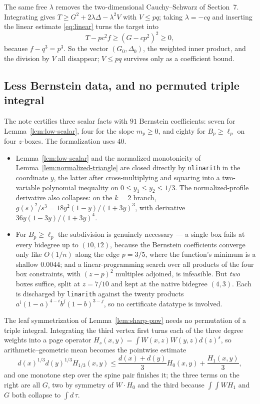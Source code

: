 \documentclass[11pt]{article}
\begin{document}
The same free $\lambda$ removes the two-dimensional Cauchy--Schwarz of
Section~7.  Integrating gives $T\geq G^2+2\lambda\Delta-\lambda^2V$ with
$V\leq pq$; taking $\lambda=-cq$ and inserting the linear estimate
\eqref{eq:linear} turns the target into
\[
 T-pc^2f\geq(G-cp^2)^2\geq0,
\]
because $f-q^3=p^3$.  So the vector $(G_0,\Delta_0)$, the weighted inner
product, and the division by $V$ all disappear; $V\leq pq$ survives only as a
coefficient bound.

\subsection{Less Bernstein data, and no permuted triple integral}
\label{sec:app148-bernstein}

The note certifies three scalar facts with $91$ Bernstein coefficients: seven
for Lemma~\ref{lem:low-scalar}, four for the slope $m_p\geq0$, and eighty for
$B_p\geq\ell_p$ on four $z$-boxes.  The formalization uses $40$.

\begin{itemize}
 \item Lemma~\ref{lem:low-scalar} and the normalized monotonicity of
 Lemma~\ref{lem:normalized-triangle} are closed directly by \texttt{nlinarith}
 in the coordinate $y$, the latter after cross-multiplying and squaring into a
 two-variable polynomial inequality on $0\leq y_1\leq y_2\leq1/3$.  The
 normalized-profile derivative also collapses: on the $k=2$ branch,
 $g(s)^2/s^3=18y^2(1-y)/(1+3y)^3$, with derivative
 $36y(1-3y)/(1+3y)^4$.
 \item For $B_p\geq\ell_p$ the subdivision is genuinely necessary — a single
 box fails at every bidegree up to $(10,12)$, because the Bernstein
 coefficients converge only like $O(1/n)$ along the edge $p=3/5$, where the
 function's minimum is a shallow $0.0044$; and a linear-programming search over
 all products of the four box constraints, with $(z-p)^2$ multiples adjoined,
 is infeasible.  But \emph{two} boxes suffice, split at $z=7/10$ and kept at
 the native bidegree $(4,3)$.  Each is discharged by \texttt{linarith} against
 the twenty products $a^i(1-a)^{4-i}b^j(1-b)^{3-j}$, so no certificate
 datatype is involved.
\end{itemize}

The leaf symmetrization of Lemma~\ref{lem:sharp-paw} needs no permutation of a
triple integral.  Integrating the third vertex first turns each of the three
degree weights into a page operator
$H_s(x,y)=\int W(x,z)W(y,z)d(z)^s$, so arithmetic--geometric mean becomes the
pointwise estimate
\[
 d(x)^{1/3}d(y)^{1/3}H_{1/3}(x,y)
 \leq\frac{d(x)+d(y)}{3}H_0(x,y)+\frac{H_1(x,y)}{3},
\]
and one monotone step over the spine pair finishes it; the three terms on the
right are all $G$, two by symmetry of $W\!\cdot\!H_0$ and the third because
$\int\!\!\int W H_1$ and $G$ both collapse to $\int d\,\tau$.
\end{document}
